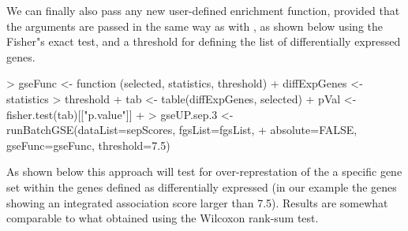 \documentclass[11pt]{article}
\newcommand{\Rcode}[1]{{\texttt{\color{BrickRed}{#1}}}}
\renewenvironment{Schunk}{\vspace{\topsep}}{\vspace{\topsep}}
\begin{document}
We can finally also pass any new user-defined enrichment function,
provided that the arguments are passed in the same way as with
\Rcode{geneSetTest}, as shown below using the Fisher"s exact test,
and a  threshold for defining the list of differentially expressed genes.

\begin{Schunk}
\begin{Sinput}
> gseFunc <- function (selected, statistics, threshold) {
+ 	diffExpGenes <- statistics > threshold
+ 	tab <- table(diffExpGenes, selected)
+ 	pVal <- fisher.test(tab)[["p.value"]]
+ 	}
> gseUP.sep.3 <- runBatchGSE(dataList=sepScores, fgsList=fgsList,
+ 				 absolute=FALSE, gseFunc=gseFunc, threshold=7.5)
\end{Sinput}
\end{Schunk}

As shown below this approach will test for over-represtation of the
a specific gene set within the genes defined as differentially expressed
(in our example the genes showing an integrated association score
larger than 7.5). Results are somewhat comparable to what obtained
using the Wilcoxon rank-sum test.
\end{document}
